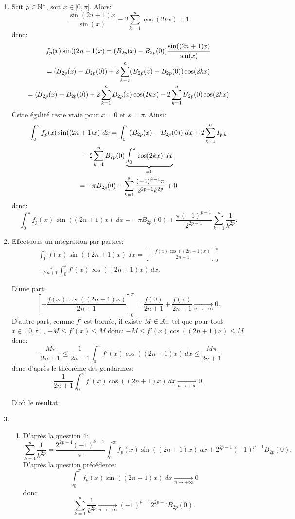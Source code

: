 \begin{enumerate}
\item Soit $p\in \mathbb{N}^{*}$, soit $x\in ]0, \pi[$. Alors:
\[ \frac{\sin (2n+1)x}{\sin (x)} = 2\sum_{k=1}^{n}\cos(2kx) + 1\]
donc:
\begin{multline*}
  f_{p}(x)\sin ((2n+1)x)  = (B_{2p}(x)-B_{2p}(0))\frac{\sin ((2n+1)x)}{\sin (x)}\notag \\
   = (B_{2p}(x)-B_{2p}(0))+ 2\sum_{k=1}^{n}(B_{2p}(x)-B_{2p}(0))\cos(2kx) \notag\\
   = (B_{2p}(x)-B_{2p}(0))+ 2\sum_{k=1}^{n}B_{2p}(x)\cos(2kx) - 2\sum_{k=1}^{n}B_{2p}(0)\cos(2kx)\notag
\end{multline*}
Cette égalité reste vraie pour $x=0$ et $x=\pi$. Ainsi:
\begin{multline*}
 \int_{0}^{\pi}f_{p}(x)\sin((2n+1)x)\ dx  = \int_{0}^{\pi}(B_{2p}(x)-B_{2p}(0))\ dx + 2\sum_{k=1}^{n}I_{p,k} \\
 - 2\sum_{k=1}^{n}B_{2p}(0)\underbrace{\int_{0}^{\pi}\cos(2kx)\ dx}_{=0} \notag\\
  = -\pi B_{2p}(0)+ \sum_{k=1}^{n}\frac{(-1)^{k-1}\pi}{2^{2p-1}k^{2p}} + 0\notag
\end{multline*}
donc:
\[ \int_{0}^{\pi}f_{p}(x)\ \sin ((2n+1)x)\ dx = -\pi B_{2p}(0) + \frac{\pi (-1)^{p-1}}{2^{2p-1}}\sum_{k=1}^{n}\frac{1}{k^{2p}}.\]


\item Effectuons un intégration par parties:
\begin{multline*}
 \int_{0}^{\pi}f(x)\sin ((2n+1)x)\ dx = \left [ -\frac{f(x)\cos((2n+1)x)}{2n+1}\right ]_{0}^{\pi}\\
 + \frac{1}{2n+1}\int_{0}^{\pi}f'(x)\cos((2n+1)x)\ dx.
\end{multline*}
     
D'une part:
\[ \left [ -\frac{f(x)\cos((2n+1)x)}{2n+1}\right ]_{0}^{\pi} = \frac{f(0)}{2n+1} + \frac{f(\pi)}{2n+1} \xrightarrow[n\to + \infty]{}0.\]
D'autre part, comme $f'$ est bornée, il existe $M\in \mathbb{R}_{+}$ tel que pour tout $x\in [0, \pi]$, $-M\leq f'(x) \leq M$ donc: $-M \leq f'(x)\cos((2n+1)x) \leq M$ donc:
\[ -\frac{M\pi}{2n+1} \leq \frac{1}{2n+1}\int_{0}^{\pi}f'(x)\cos((2n+1)x)\ dx \leq \frac{M\pi }{2n+1}\]
donc d'après le théorème des gendarmes: 
\[ \frac{1}{2n+1}\int_{0}^{\pi}f'(x)\cos((2n+1)x)\ dx \xrightarrow[n\to + \infty]{}0.\]

D'où le résultat.

\item \begin{enumerate}
           \item D'après la question 4:
\[ \sum_{k=1}^{n}\frac{1}{k^{2p}} = \frac{2^{2p-1}(-1)^{k-1}}{\pi}\int_{0}^{\pi}f_{p}(x)\sin ((2n+1)x)\ dx + 2^{2p-1}(-1)^{p-1} B_{2p}(0). \]
D'après la question précédente:
\[ \int_{0}^{\pi}f_{p}(x)\sin((2n+1)x)\ dx \xrightarrow[n\to + \infty]{}0\]
donc:
\[ \sum_{k=1}^{n}\frac{1}{k^{2p}}\xrightarrow[n\to + \infty]{}(-1)^{p-1}2^{2p-1}B_{2p}(0).\]
         

\end{enumerate}
\end{enumerate}
